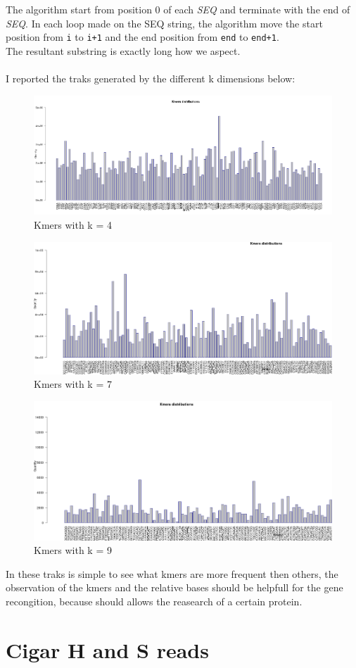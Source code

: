 The algorithm start from position 0 of each \emph{SEQ} and terminate with the end of \emph{SEQ}.
In each loop made on the SEQ string, the algorithm move the start position from \verb|i| to \verb|i+1| and the end position from \verb|end| to \verb|end+1|.\\
The resultant substring is exactly long how we aspect.\\\\

I reported the traks generated by the different k dimensions below:

 \begin{figure}[H]
				\centering
				\includegraphics[scale=0.45]{immagini/kmers_4.png}
				\caption{Kmers with k = 4}\label{fig:12}
				\end{figure}


 \begin{figure}[H]
				\centering
				\includegraphics[scale=0.45]{immagini/kmers_7.png}
				\caption{Kmers with k = 7}\label{fig:13}
				\end{figure}
				
				
				
 \begin{figure}[H]
				\centering
				\includegraphics[scale=0.45]{immagini/kmers_9.png}
				\caption{Kmers with k = 9}\label{fig:14}
				\end{figure}	
				
In these traks is simple to see what kmers are more frequent then others, the observation of the kmers and the relative bases should be helpfull for the gene recongition, because should allows the reasearch of a certain protein.				

\section{Cigar H and S reads}
